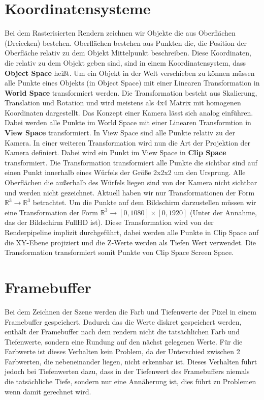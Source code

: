 \section{Koordinatensysteme}
\label{section:coords}
Bei dem Rasterisierten Rendern zeichnen wir Objekte die aus Oberflächen (Dreiecken) bestehen.
Oberflächen bestehen aus Punkten die, die Position der Oberfläche relativ zu dem Objekt Mittelpunkt beschreiben.
Diese Koordinaten, die relativ zu dem Objekt geben sind, sind in einem Koordinatensystem, dass \textbf{Object Space} heißt.
Um ein Objekt in der Welt verschieben zu können müssen alle Punkte eines Objekts (in Object Space) mit einer Linearen Transformation
in \textbf{World Space} transformiert werden.
Die Transformation besteht aus Skalierung, Translation und Rotation und wird meistens als 4x4 Matrix mit homogenen Koordinaten dargestellt.
Das Konzept einer Kamera lässt sich analog einführen.
Dabei werden alle Punkte im World Space mit einer Linearen Transformtion in \textbf{View Space} transformiert.
In View Space sind alle Punkte relativ zu der Kamera.
In einer weiteren Transformation wird nun die Art der Projektion der Kamera definiert. 
Dabei wird ein Punkt im View Space in \textbf{Clip Space} transformiert.
Die Transformation transformiert alle Punkte die sichtbar sind auf einen Punkt innerhalb eines Würfels der Größe 2x2x2 um den Ursprung.
Alle Oberflächen die außerhalb des Würfels liegen sind von der Kamera nicht sichtbar und werden nicht gezeichnet.
Aktuell haben wir nur Transformationen der Form $\mathbb{R}^3 \rightarrow \mathbb{R}^3$ betrachtet.
Um die Punkte auf dem Bildschirm darzustellen müssen wir eine Transformation der Form 
$\mathbb{R}^3 \rightarrow [0,1080]\times[0,1920]$ (Unter der Annahme, das der Bildschirm FullHD ist).
Diese Transformation wird von der Renderpipeline implizit durchgeführt, dabei werden alle Punkte in Clip Space 
auf die XY-Ebene projiziert und die Z-Werte werden als Tiefen Wert verwendet. 
Die Transformation transformiert somit Punkte von Clip Space Screen Space.

\section{Framebuffer}
Bei dem Zeichnen der Szene werden die Farb und Tiefenwerte der Pixel in einem Framebuffer gespeichert.
Dadurch das die Werte diskret gespeichert werden, enthält der Framebuffer nach dem rendern nicht die tatsächlichen Farb und 
Tiefenwerte, sondern eine Rundung auf den nächst gelegenen Werte.
Für die Farbwerte ist dieses Verhalten kein Problem, da der Unterschied zwischen 2 Farbwerten, die nebeneinander liegen, nicht erkennbar ist.
Dieses Verhalten führt jedoch bei Tiefenwerten dazu, dass in der Tiefenwert des Framebuffers niemals die tatsächliche Tiefe, 
sondern nur eine Annäherung ist, dies führt zu Problemen wenn damit gerechnet wird.

